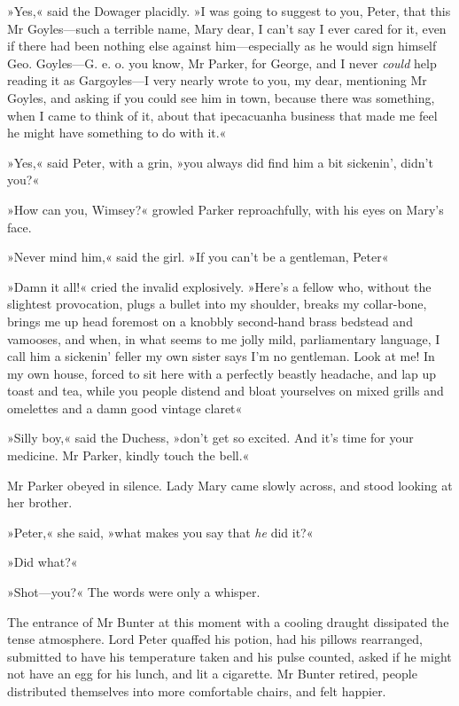 »Yes,« said the Dowager placidly. »I was going to suggest to you, Peter, that this Mr Goyles—such a terrible name, Mary dear, I can't say I ever cared for it, even if there had been nothing else against him—especially as he would sign himself Geo. Goyles—G. e. o. you know, Mr Parker, for George, and I never \textit{could} help reading it as Gargoyles—I very nearly wrote to you, my dear, mentioning Mr Goyles, and asking if you could see him in town, because there was something, when I came to think of it, about that ipecacuanha business that made me feel he might have something to do with it.«

»Yes,« said Peter, with a grin, »you always did find him a bit sickenin', didn't you?«

»How can you, Wimsey?« growled Parker reproachfully, with his eyes on Mary's face.

»Never mind him,« said the girl. »If you can't be a gentleman, Peter\longdash«

»Damn it all!« cried the invalid explosively. »Here's a fellow who, without the slightest provocation, plugs a bullet into my shoulder, breaks my collar-bone, brings me up head foremost on a knobbly second-hand brass bedstead and vamooses, and when, in what seems to me jolly mild, parliamentary language, I call him a sickenin' feller my own sister says I'm no gentleman. Look at me! In my own house, forced to sit here with a perfectly beastly headache, and lap up toast and tea, while you people distend and bloat yourselves on mixed grills and omelettes and a damn good vintage claret\longdash«

»Silly boy,« said the Duchess, »don't get so excited. And it's time for your medicine. Mr Parker, kindly touch the bell.«

Mr Parker obeyed in silence. Lady Mary came slowly across, and stood looking at her brother.

»Peter,« she said, »what makes you say that \textit{he} did it?«

»Did what?«

»Shot—you?« The words were only a whisper.

The entrance of Mr Bunter at this moment with a cooling draught dissipated the tense atmosphere. Lord Peter quaffed his potion, had his pillows rearranged, submitted to have his temperature taken and his pulse counted, asked if he might not have an egg for his lunch, and lit a cigarette. Mr Bunter retired, people distributed themselves into more comfortable chairs, and felt happier.


